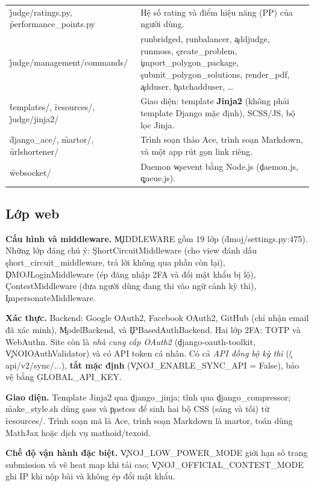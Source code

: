\begin{center}
\begin{tabularx}{\textwidth}{@{}L{3.3cm}Y@{}}
\f{judge/ratings.py}, \f{performance_points.py} & Hệ số rating và điểm hiệu năng (PP) của người dùng. \\
\f{judge/management/commands/} & \c{runbridged}, \c{runbalancer}, \c{addjudge}, \c{runmoss}, \c{create_problem}, \c{import_polygon_package}, \c{submit_polygon_solutions}, \c{render_pdf}, \c{adduser}, \c{batchadduser}, \ldots \\
\f{templates/}, \f{resources/}, \f{judge/jinja2/} & Giao diện: template \textbf{Jinja2} (không phải template Django mặc định), SCSS/JS, bộ lọc Jinja. \\
\f{django_ace/}, \f{martor/}, \f{urlshortener/} & Trình soạn thảo Ace, trình soạn Markdown, và một app rút gọn link riêng. \\
\f{websocket/} & Daemon \c{wsevent} bằng Node.js (\c{daemon.js}, \c{queue.js}). \\
\bottomrule
\end{tabularx}
\end{center}

\subsection{Lớp web}\label{sec:web}
\textbf{Cấu hình và middleware.} \c{MIDDLEWARE} gồm 19 lớp (\f{dmoj/settings.py:475}). Những lớp đáng chú ý: \c{ShortCircuitMiddleware} (cho view đánh dấu \c{short_circuit_middleware}, trả lời không qua phần còn lại), \c{DMOJLoginMiddleware} (ép đăng nhập 2FA và đổi mật khẩu bị lộ), \c{ContestMiddleware} (đưa người dùng đang thi vào ngữ cảnh kỳ thi), \c{ImpersonateMiddleware}. \tS

\textbf{Xác thực.} Backend: Google OAuth2, Facebook OAuth2, GitHub (chỉ nhận email đã xác minh), \c{ModelBackend}, và \c{IPBasedAuthBackend}. Hai lớp 2FA: TOTP và WebAuthn. Site còn là \emph{nhà cung cấp OAuth2} (\c{django-oauth-toolkit}, \c{VNOIOAuthValidator}) và có API token cá nhân. Có cả \emph{API đồng bộ kỳ thi} (\c{/api/v2/sync/...}), \textbf{tắt mặc định} (\c{VNOJ_ENABLE_SYNC_API = False}), bảo vệ bằng \c{GLOBAL_API_KEY}. \tS

\textbf{Giao diện.} Template Jinja2 qua \c{django_jinja}; tĩnh qua \c{django_compressor}; \f{make_style.sh} dùng \c{sass} và \c{postcss} để sinh hai bộ CSS (sáng và tối) từ \f{resources/}. Trình soạn mã là Ace, trình soạn Markdown là martor, toán dùng MathJax hoặc dịch vụ mathoid/texoid. \tS

\textbf{Chế độ vận hành đặc biệt.} \c{VNOJ_LOW_POWER_MODE} giới hạn số trang submission và vẽ heat map khi tải cao; \c{VNOJ_OFFICIAL_CONTEST_MODE} ghi IP khi nộp bài và không ép đổi mật khẩu. \tS

